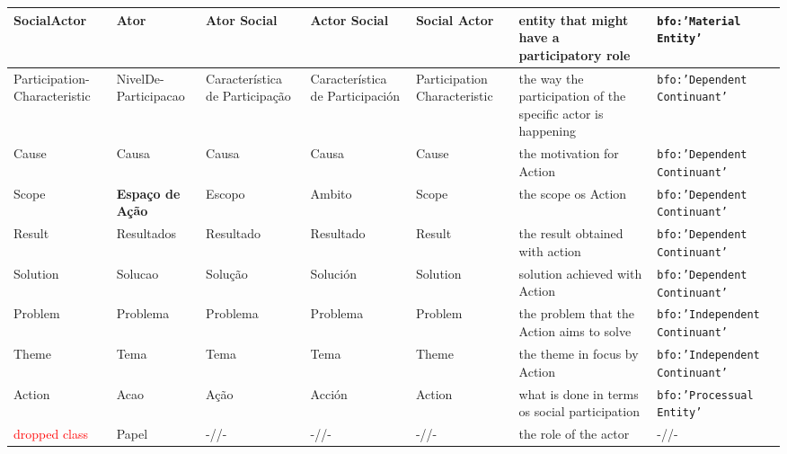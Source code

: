 \documentclass[10pt,letterpaper]{article}
\begin{document}
\begin{table}[!h]
\begin{adjustwidth}{-2.25in}{0in}
\begin{tabular}{|p{1.8cm}|p{1.6cm}||p{2.2cm}|p{2.2cm}|p{1.8cm}||p{4cm}||p{3cm}|}
SocialActor & Ator & Ator Social & Actor Social & Social Actor & entity that might have a participatory role & {\tt bfo:'Material Entity'} \\ \hline \hline
Participation-Characteristic & NivelDe-Participacao & Caracter\'istica de Participa\c{c}\~ao & Caracter\'istica de Participaci\'on & Participation Characteristic & the way the participation of the specific actor is happening & {\tt bfo:'Dependent Continuant'} \\\hline
Cause & Causa & Causa & Causa &  Cause & the motivation for Action & {\tt bfo:'Dependent Continuant'} \\\hline
      Scope &{\bf Espa\c{c}o de A\c{c}\~ao} & Escopo & Ambito & Scope & the scope os Action & {\tt bfo:'Dependent Continuant'} \\\hline
Result & Resultados & Resultado & Resultado & Result & the result obtained with action & {\tt bfo:'Dependent Continuant'} \\\hline
      Solution & Solucao & Solu\c{c}\~ao & Soluci\'on & Solution & solution achieved with Action & {\tt bfo:'Dependent Continuant'} \\\hline \hline
      Problem & Problema & Problema & Problema & Problem & the problem that the Action aims to solve & {\tt bfo:'Independent Continuant'} \\\hline
Theme & Tema & Tema & Tema & Theme & the theme in focus by Action & {\tt bfo:'Independent Continuant'} \\\hline \hline
Action & Acao & A\c{c}\~ao & Acci\'on & Action & what is done in terms os social participation & {\tt bfo:'Processual Entity'} \\\hline\hline
\textcolor{red}{dropped class} & Papel & -//-  & -//- & -//- & the role of the actor & -//- \\ \hline
  \end{tabular}
  \label{ospClasses}
\end{adjustwidth}
\end{table}
\end{document}
